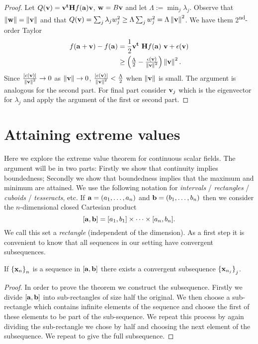 \begin{proof}
    Let \(Q(\vv) =  \vv^{\mathbf{t}} \mathbf{H} f (\aa) \vv  \),  \(\ww = B \vv\) and let \(\Lambda := \min_j \lambda_j\).
    Observe that \(\norm{\ww} =  \norm{\vv}\) and that \(Q(\vv)=  \sum_{j} \lambda_j w_j^2  \geq \Lambda \sum_{j} w_j^2 = \Lambda  \norm{\vv}^2 \).
    We have them 2\textsuperscript{nd}-order Taylor
    \[
        \begin{aligned}
                   f(\aa+\vv) - f(\aa)
        &=  \frac{1}{2} \vv^{\mathbf{t}} \ \mathbf{H} f (\aa) \ \vv +  \epsilon(\vv)\\
        &\geq  \left(\tfrac{\Lambda}{2} - \tfrac{\epsilon(\vv)}{\norm{\vv}^2} \right) \norm{\vv}^2.
        \end{aligned}
    \]
    Since \(\frac{\abs{\epsilon(\vv)}}{\norm{\vv}^2} \to 0\) as \(\norm{\vv}\to 0\), \( \frac{\abs{\epsilon(\vv)}}{\norm{\vv}^2} < \tfrac{\Lambda}{2}\) when \(\norm{\vv}\) is small.
    The argument is analogous for the second part. For final part consider \(\vv_j\) which is the eigenvector for \(\lambda_j\) and apply the argument of the first or second part.
\end{proof}

\section{Attaining extreme values}

Here we explore the extreme value theorem for continuous scalar fields.
The argument will be in two parts:
Firstly we show that continuity implies boundedness;
Secondly we show that boundedness implies that the maximum and minimum are attained.
We use the following notation for \emph{intervals} / \emph{rectangles} / \emph{cuboids} / \emph{tesseracts}, etc.
If \(\aa = (a_1,\ldots,a_n)\) and  \(\bb = (b_1,\ldots,b_n)\)
then we consider the \(n\)-dimensional closed Cartesian product
\[
    [\aa,\bb] = [a_1,b_1] \times \cdots \times [a_n,b_n].
\]
We call this set a \emph{rectangle} (independent of the dimension).
As a first step it is convenient to know that all sequences in our setting have convergent subsequences.

\begin{theorem}
    If \({\{\xx_{n}\}}_{n}\) is a sequence in \( [\aa,\bb]\)
    there exists a convergent subsequence \({\{\xx_{n_j}\}}_{j}\).
\end{theorem}

\begin{proof}
    In order to prove the theorem we construct the subsequence.
    Firstly we divide \( [\aa,\bb]\) into sub-rectangles of size half the original.
    We then choose a sub-rectangle which contains infinite elements of the sequence and choose the first of these elements to be part of the sub-sequence.
    We repeat this process by again dividing the sub-rectangle we chose by half and choosing the next element of the subsequence.
    We repeat to give the full subsequence.
\end{proof}

